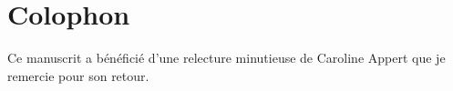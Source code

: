 
\pagestyle{empty}



\section*{Colophon}

Ce manuscrit a bénéficié d'une relecture minutieuse de Caroline Appert que je remercie pour son retour. 